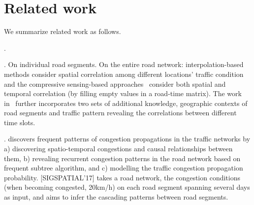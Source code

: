 \section{Related work}
\label{sec-related}
We summarize related work as follows.

.

. On individual road segments. On the entire road network: interpolation-based methods consider spatial correlation among different locations' traffic condition and the compressive sensing-based approaches~\cite{Zhu2013TMC} consider both spatial and temporal correlation (by filling empty values in a road-time matrix). The work in~\cite{Shang2014KDD} further incorporates two sets of additional knowledge, \ie geographic contexts of road segments and traffic pattern revealing the correlations between different time slots.

. \cite{Nguyen2017TBD} discovers frequent patterns of congestion propagations in the traffic networks by a) discovering spatio-temporal congestions and causal relationships between them, b) revealing recurrent congestion patterns in the road network based on frequent subtree algorithm, and c) modelling the traffic congestion propagation probability. [SIGSPATIAL'17] takes a road network, the congestion conditions (when becoming congested, 20km/h) on each road segment spanning several days as input, and aims to infer the cascading patterns between road segments.
